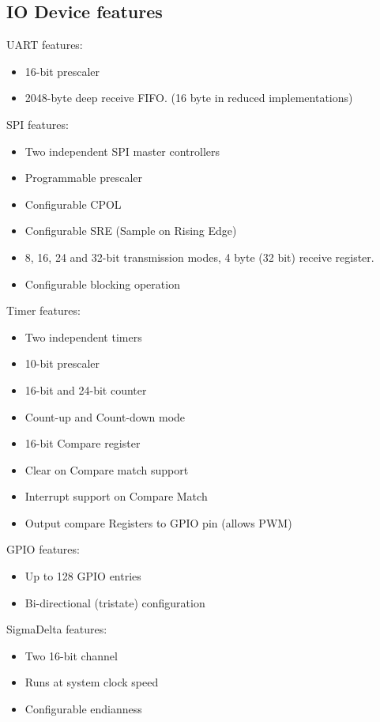 \subsection{IO Device features}

UART features:
\begin{itemize}
\item 16-bit prescaler
\item 2048-byte deep receive FIFO. (16 byte in reduced implementations)
\end{itemize}

SPI features:
\begin{itemize}
\item Two independent SPI master controllers
\item Programmable prescaler
\item Configurable CPOL
\item Configurable SRE (Sample on Rising Edge)
\item 8, 16, 24 and 32-bit transmission modes, 4 byte (32 bit) receive register.
\item Configurable blocking operation
\end{itemize}

Timer features:
\begin{itemize}
\item Two independent timers
\item 10-bit prescaler
\item 16-bit and 24-bit counter
\item Count-up and Count-down mode
\item 16-bit Compare register
\item Clear on Compare match support
\item Interrupt support on Compare Match
\item Output compare Registers to GPIO pin (allows PWM)
\end{itemize}

GPIO features:
\begin{itemize}
\item Up to 128 GPIO entries
\item Bi-directional (tristate) configuration
\end{itemize}

SigmaDelta features:
\begin{itemize}
\item Two 16-bit channel
\item Runs at system clock speed
\item Configurable endianness
\end{itemize}

